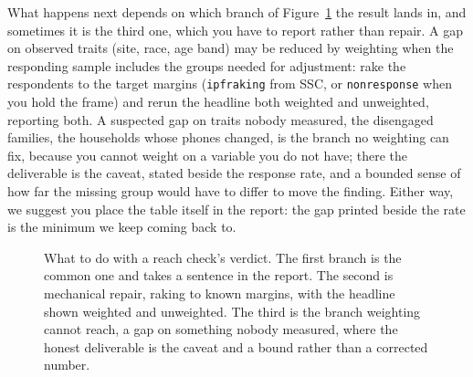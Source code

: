 What happens next depends on which branch of Figure~\ref{fig:ch05-reachtree} the result lands in, and sometimes it is the third one, which you have to report rather than repair. A gap on observed traits (site, race, age band) may be reduced by weighting when the responding sample includes the groups needed for adjustment: rake the respondents to the target margins (\texttt{ipfraking} from SSC, or \texttt{nonresponse} when you hold the frame) and rerun the headline both weighted and unweighted, reporting both. A suspected gap on traits nobody measured, the disengaged families, the households whose phones changed, is the branch no weighting can fix, because you cannot weight on a variable you do not have; there the deliverable is the caveat, stated beside the response rate, and a bounded sense of how far the missing group would have to differ to move the finding. Either way, we suggest you place the table itself in the report: the gap printed beside the rate is the minimum we keep coming back to.

\begin{figure}[htbp]
\centering
{}
\caption[What to do with a reach check's verdict]{What to do with a reach check's verdict. The first branch is the common one and takes a sentence in the report. The second is mechanical repair, raking to known margins, with the headline shown weighted and unweighted. The third is the branch weighting cannot reach, a gap on something nobody measured, where the honest deliverable is the caveat and a bound rather than a corrected number.}
\label{fig:ch05-reachtree}
\end{figure}


